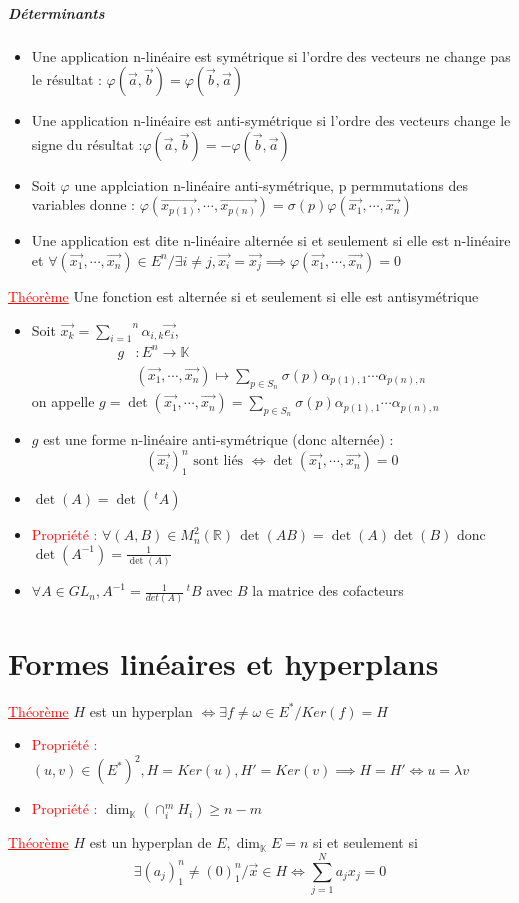\documentclass[a4paper, french]{article}
\newcommand{\R}{\mathbb{R}}
\newcommand{\K}{\mathbb{K}}
\newcommand{\al}{\alpha}
\newcommand{\la}{\lambda}
\newcommand{\ph}{\varphi}
\newcommand{\som}[2]{\overset{#2}{\underset{#1}{\sum}}}
\newcommand{\thm}{\textcolor{red}{\underline{Théorème} }}
\newcommand{\ppt}{\textcolor{red}{Propriété : }}
\newcommand{\inv}[1]{\frac{1}{#1}}
\begin{document}
	\subparagraph{Déterminants}
	\begin{itemize}
 		\item Une application n-linéaire est symétrique si l'ordre des vecteurs ne change pas le résultat : $\ph(\vec{a},\vec{b})=\ph(\vec{b},\vec{a})$
 		\item Une application n-linéaire est anti-symétrique si l'ordre des vecteurs change le signe du résultat :$\ph(\vec{a},\vec{b})= - \ph(\vec{b},\vec{a})$
 		\item Soit $\ph$ une applciation n-linéaire anti-symétrique, p permmutations des variables donne : $\ph(\vec{x_{p(1)}},\cdots,\vec{x_{p(n)}})= \sigma(p) \ph(\vec{x_1},\cdots,\vec{x_n})$
 		\item Une application est dite n-linéaire alternée si et seulement si elle est n-linéaire et $\forall (\vec{x_1},\cdots,\vec{x_n}) \in E^n / \exists i  \neq j, \vec{x_i}=\vec{x_j} \implies \ph(\vec{x_1},\cdots,\vec{x_n})=0$
	\end{itemize}
	 \thm Une fonction est alternée si et seulement si elle est antisymétrique
	\begin{itemize}
 		\item Soit $\vec{x_k}=\som{i=1}{n}\al_{i,k}\vec{e_i}$, 
			\begin{align*}
				g &: E^n \rightarrow \K \\
				&(\vec{x_1},\cdots,\vec{x_n}) \mapsto \som{p\in S_n}{}\sigma(p)\al_{p(1),1}\cdots\al_{p(n),n}
			\end{align*}
			on appelle $g=\det(\vec{x_1},\cdots,\vec{x_n})=\som{p\in S_n}{}\sigma(p)\al_{p(1),1}\cdots\al_{p(n),n}$
 		\item $g$ est une forme n-linéaire anti-symétrique (donc alternée) : $$(\vec{x_i})_1^n \text{ sont liés }\iff \det(\vec{x_1},\cdots,\vec{x_n})=0$$
 		\item $\det(A)=\det(\,^tA)$
 		\item \ppt $\forall (A,B)\in M_n^2(\R) \, \det(AB)=\det(A)\det(B)$ donc $\det(A^{-1})=\inv{\det(A)}$
 		\item $\forall A \in GL_n, A^{-1}=\inv{det(A)}\,^tB$ avec $B$ la matrice des cofacteurs
	\end{itemize}

	\section{Formes linéaires et hyperplans}
	 \thm $H$ est un hyperplan $\iff \exists f \neq \omega \in E^* / Ker(f)=H$
	\begin{itemize}
 		\item \ppt $(u,v)\in (E^*)^2, H=Ker(u), H'=Ker(v) \implies H=H' \iff u=\la v$
 		\item \ppt $\dim_{\K}(\cap_i^m H_i)\geqslant n-m$
	\end{itemize}
	 \thm $H$ est un hyperplan de $E, \dim_{\K}E=n$ si et seulement si $$\exists (a_j)_1^n \neq (0)_1^n / \vec{x} \in H \iff \som{j=1}{N}a_jx_j=0$$
\end{document}
